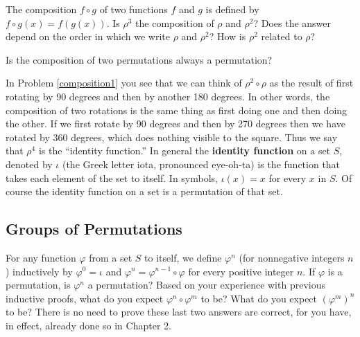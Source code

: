 \iteme The composition
$f\circ g$ of two functions
$f$ and
$g$ is defined by $f\circ g(x) = f(g(x))$.  Is $\rho^3$ the composition of
$\rho$ and
$\rho^2$?  Does the answer depend on the order in which we write $\rho$
and
$\rho^2$? How is
$\rho^2$ related to
$\rho$? \label{composition1}

\iteme Is the composition of two permutations always a permutation?

\ep 

In Problem \ref{composition1} you see that we can think of
$\rho^2\circ\rho$ as the result of first rotating by 90 degrees and then
by another 180 degrees.  In other words, the composition of two rotations
is the same thing as first doing one and then doing the other. If we
first rotate by 90 degrees and then by 270 degrees then we have rotated
by 360 degrees, which does nothing visible to the square.  Thus we say
that $\rho^4$ is the ``identity function.''  In general the {\bf identity
function} on a set $S$,
denoted by
$\iota$ (the Greek letter iota, pronounced eye-oh-ta) is the function
that takes each element of the set to itself.  In symbols, $\iota(x) =x$
for every
$x$ in
$S$.  Of course the identity function on a set is a permutation of that
set. 

\subsection{Groups of Permutations}
\bp
\iteme For any function $\varphi$ from a set $S$ to itself, we define
$\varphi^n$ (for nonnegative integers $n$) inductively by $\varphi^0 =
\iota$ and $\varphi^n = \varphi^{n-1}\circ\varphi$ for every positive
integer $n$.  If $\varphi$ is a permutation, is $\varphi^n$ a permutation?
Based on your experience with previous inductive proofs, what do you
expect $\varphi^n\circ \varphi^m$ to be?  What do you expect
$(\varphi^m)^n$ to be?  There is no need to prove these last two answers
are correct, for you have, in effect, already done so in Chapter 2.

